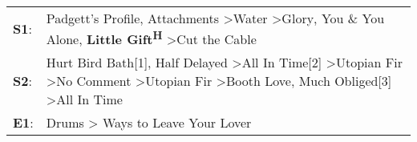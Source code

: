 \begin{supertabular}{p{0.03\textwidth}p{0.92\textwidth}}
 \textbf{S1}:  &                                                                                                                       Padgett's Profile\textsuperscript{}, \enspace Attachments\textsuperscript{} \textgreater \enspace Water\textsuperscript{} \textgreater \enspace Glory\textsuperscript{}, \enspace You \& You Alone\textsuperscript{}, \enspace \textbf{Little Gift\textsuperscript{H}} \textgreater \enspace Cut the Cable\textsuperscript{}  \enspace  \\
 \textbf{S2}:  &  Hurt Bird Bath[1]\textsuperscript{}, \enspace Half Delayed\textsuperscript{} \textgreater \enspace All In Time[2]\textsuperscript{} \textgreater \enspace Utopian Fir\textsuperscript{} \textgreater \enspace No Comment\textsuperscript{} \textgreater \enspace Utopian Fir\textsuperscript{} \textgreater \enspace Booth Love\textsuperscript{}, \enspace Much Obliged[3]\textsuperscript{} \textgreater \enspace All In Time\textsuperscript{}  \enspace  \\
 \textbf{E1}:  &                                                                                                                                                                                                                                                                                                                                                        Drums\textsuperscript{} \textgreater {} Ways to Leave Your Lover\textsuperscript{}  \enspace  \\
\end{supertabular}
